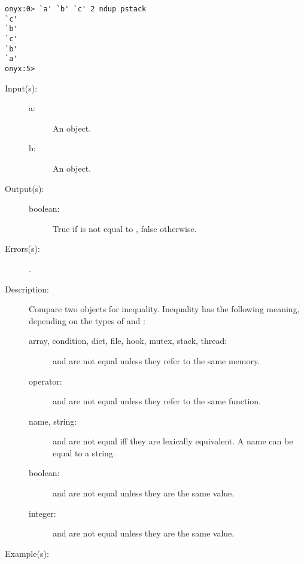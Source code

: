 \begin{description}
\begin{description}
\begin{verbatim}
onyx:0> `a' `b' `c' 2 ndup pstack
`c'
`b'
`c'
`b'
`a'
onyx:5>
		\end{verbatim}
	\end{description}
\label{systemdict:ne}
\item[{\onyxop{a b}{ne}{boolean}}: ]
	\begin{description}\item[]
	\item[Input(s): ]
		\begin{description}\item[]
		\item[a: ]
			An object.
		\item[b: ]
			An object.
		\end{description}
	\item[Output(s): ]
		\begin{description}\item[]
		\item[boolean: ]
			True if  is not equal to , false
			otherwise.
		\end{description}
	\item[Errors(s): ]
		\begin{description}\item[]
		\item[.]
		\end{description}
	\item[Description: ]
		Compare two objects for inequality.  Inequality has the
		following meaning, depending on the types of  and
		:
		\begin{description}
		\item[array, condition, dict, file, hook, mutex, stack,
		thread: ]  and  are not equal unless they
		refer to the same memory.
		\item[operator: ]  and  are not equal unless
		they refer to the same function.
		\item[name, string: ]  and  are not equal iff
		they are lexically equivalent.  A name can be equal to a string.
		\item[boolean: ]  and  are not equal unless
		they are the same value.
		\item[integer: ]  and  are not equal unless
		they are the same value.
		\end{description}
	\item[Example(s): ]\begin{verbatim}


\end{verbatim}
\end{description}
\end{description}
